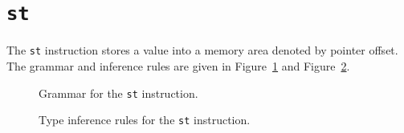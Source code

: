 \section{\texttt{st}}\label{sec:nstar-instructionset-st}

The \texttt{st} instruction stores a value into a memory area denoted by pointer offset.
The grammar and inference rules are given in Figure~\ref{fig:nstar-instructionset-st-grammar} and Figure~\ref{fig:nstar-instructionset-st-typerules}.

\begin{figure}[H]
  \centering


  \caption{Grammar for the \texttt{st} instruction.}
  \label{fig:nstar-instructionset-st-grammar}
\end{figure}

\begin{figure}[H]
  \centering


  \caption{Type inference rules for the \texttt{st} instruction.}
  \label{fig:nstar-instructionset-st-typerules}
\end{figure}

